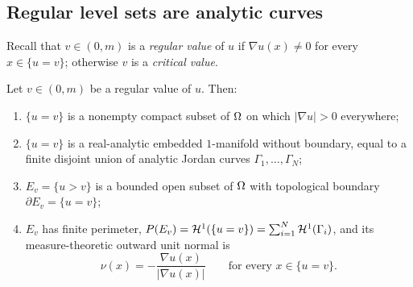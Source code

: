 \subsection*{Regular level sets are analytic curves}

Recall that $v\in(0,m)$ is a \emph{regular value} of $u$ if $\nabla u(x)\ne0$
for every $x\in\{u=v\}$; otherwise $v$ is a \emph{critical value}.

\begin{lemma}\label{lem:smooth-level}
Let $v\in(0,m)$ be a regular value of $u$. Then:
\begin{enumerate}
\item[(a)] $\{u=v\}$ is a nonempty compact subset of $\Omega$ on which
  $|\nabla u|>0$ everywhere;
\item[(b)] $\{u=v\}$ is a real-analytic embedded $1$-manifold without
  boundary, equal to a finite disjoint union of analytic Jordan curves
  $\Gamma_1,\dots,\Gamma_N$;
\item[(c)] $E_v=\{u>v\}$ is a bounded open subset of $\Omega$ with topological
  boundary $\partial E_v=\{u=v\}$;
\item[(d)] $E_v$ has finite perimeter,
  $P(E_v)=\mathcal{H}^1(\{u=v\})=\sum_{i=1}^N\mathcal{H}^1(\Gamma_i)$, and its measure-theoretic
  outward unit normal is
  \[
    \nu(x)=-\frac{\nabla u(x)}{|\nabla u(x)|}\qquad\text{for every }x\in\{u=v\}.
  \]
\end{enumerate}
\end{lemma}

